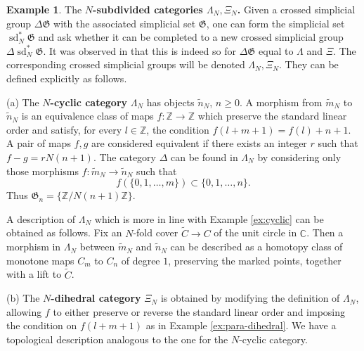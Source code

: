 \documentclass[english,11pt,leqno]{article}
\def\CC{\mathbb{C}}
\def\ZZ{\mathbb{Z}}
\def\Gen{\mathfrak{G}}
\def\on{\operatorname}
\def\kcn{\widetilde{n}_N}
\def\kcm{\widetilde{m}_N}
\theoremstyle{definition}
\newtheorem{exa}[thm]{Example}
\theoremstyle{remark}
\numberwithin{equation}{section}
\begin{document}
\begin{exa} 
 \label{ex:subdivided} The {\bf $N$-subdivided categories $\Lambda_N, \Xi_N$.}
 Given a crossed simplicial group $\Delta\Gen$ with the associated simplicial set $\Gen$,
 one can form the simplicial set $\on{sd}_N^*\Gen$ and ask whether it can be
 completed to a new crossed simplicial group $\Delta\on{sd}_N^*\Gen$. 
 It was observed  in \cite[Ex.7]{fiedorowicz-loday} that this is indeed so
 for $\Delta\Gen$ equal to $\Lambda$ and $\Xi$.
 The corresponding crossed simplicial groups will be denoted $\Lambda_N, \Xi_N$. 
 They can be defined explicitly as follows.
 
 (a) The {\bf $N$-cyclic category} $\Lambda_{N}$ has objects $\kcn$, $n \ge 0$. A
	morphism from $\kcm$ to $\kcn$ is  an equivalence class of maps 
	$f: \ZZ \to \ZZ$ which preserve the standard linear order and satisfy, for every $l \in \ZZ$, the condition $f(l +
	m+1) = f(l) + n + 1$. A pair of maps $f,g$ are considered equivalent if there exists an integer $r$ such that
	$f - g = rN(n+1)$. The category $\Delta$ can be found in $\Lambda_{N}$ by
	considering only those morphisms $f:\kcm \to \kcn$ such that 
	\[
	f(\{0,1,\dots, m\}) \subset \{0,1,\dots,n\}.
	\]
	Thus $\Gen_n= \{\ZZ/N(n+1)\ZZ\}$.  
	 
	A description of $\Lambda_N$ which is more in line with Example \ref{ex:cyclic} can be obtained
	as follows. Fix an $N$-fold cover $\widetilde{C} \to C$ of the unit circle in $\CC$. Then a
	morphism in $\Lambda_N$ between $\kcm$ and $\kcn$ can be described as a homotopy class of
	monotone maps $C_m$ to $C_n$ of degree $1$, preserving the marked points, together with a lift to $\widetilde{C}$.
	
	(b) The {\bf $N$-dihedral category} $\Xi_N$ is obtained by modifying the definition of $\Lambda_N$, 
	 allowing $f$ to either preserve or
	reverse the standard linear order and imposing the condition on $f(l+m+1)$ as in Example 
	\ref{ex:para-dihedral}. We have a topological description analogous to the one for the
	$N$-cyclic category.
\end{exa}
\end{document}
